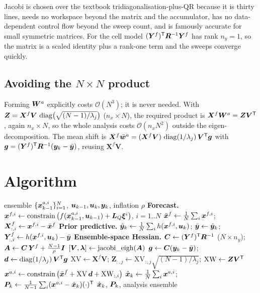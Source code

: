 Jacobi is chosen over the textbook tridiagonalisation-plus-QR because it is thirty lines, needs no
workspace beyond the matrix and the accumulator, has no data-dependent control flow beyond the
sweep count, and is famously accurate for small symmetric matrices.  For the cell model
$(\bm{Y}^f)^{\mathsf{T}}\bm{R}^{-1}\bm{Y}^f$ has rank $n_y = 1$, so the matrix is a scaled identity plus a rank-one
term and the sweeps converge quickly.

\subsection{Avoiding the $N\times N$ product}
Forming $\bm{W}^a$ explicitly costs $\mathcal{O}(N^3)$; it is never needed.  With
$\bm{Z} = \bm{X}^f\bm{V}\,\operatorname{diag}\!\big(\sqrt{(N-1)/\lambda_j}\big)$ ($n_x\times N$), the required product is
$\bm{X}^f\bm{W}^a = \bm{Z}\bm{V}^{\mathsf{T}}$, again $n_x\times N$, so the whole analysis costs
$\mathcal{O}(n_x N^2)$ outside the eigen-decomposition.  The mean shift is
$\bm{X}^f\bar{\bm w}^a = (\bm{X}^f\bm{V})\,\operatorname{diag}(1/\lambda_j)\,\bm{V}^{\mathsf{T}}\bm g$ with
$\bm g = (\bm{Y}^f)^{\mathsf{T}}\bm{R}^{-1}(\bm{y}_k-\bar{\bm{y}})$, reusing $\bm{X}^f\bm{V}$.

\section{Algorithm}
\begin{algorithm}[H]
\caption{ETKF --- one sampling period}
\begin{algorithmic}[1]
\Require ensemble $\{\bm{x}^{a,i}_{k-1}\}_{i=1}^N$, $\bm{u}_{k-1},\bm{u}_k,\bm{y}_k$, inflation $\rho$
\State \textbf{Forecast.} $\bm{x}^{f,i} \gets \operatorname{constrain}\big(f(\bm{x}^{a,i}_{k-1},\bm{u}_{k-1}) + \bm{L}_Q\bm\xi^i\big)$, $i=1..N$
\State $\bar{\bm{x}}^f \gets \frac1N\sum_i \bm{x}^{f,i}$; \quad $\bm{X}^f_{:,i} \gets \bm{x}^{f,i}-\bar{\bm{x}}^f$
\State \textbf{Prior predictive.} $\hat{\bm{y}}_k \gets \frac1N\sum_i h(\bm{x}^{f,i},\bm{u}_k)$; \; $\bar{\bm{y}}\gets\hat{\bm{y}}_k$; \; $\bm{Y}^f_{:,i}\gets h(\bm{x}^{f,i},\bm{u}_k)-\bar{\bm{y}}$
\State \textbf{Ensemble-space Hessian.} $\bm{C} \gets (\bm{Y}^f)^{\mathsf{T}}\bm{R}^{-1}$ \; ($N\times n_y$); \quad $\bm{A} \gets \bm{C}\,\bm{Y}^f + \frac{N-1}{\rho}\bm{I}$
\State $[\bm{V},\bm\lambda] \gets \operatorname{jacobi\_eigh}(\bm{A})$ 
\State $\bm g \gets \bm{C}(\bm{y}_k-\bar{\bm{y}})$; \quad $\bm d \gets \operatorname{diag}(1/\lambda_j)\,\bm{V}^{\mathsf{T}}\bm g$
\State $\mathrm{XV} \gets \bm{X}^f\bm{V}$; \quad $\bm{Z}_{:,j} \gets \mathrm{XV}_{:,j}\sqrt{(N-1)/\lambda_j}$; \quad $\mathrm{XW} \gets \bm{Z}\bm{V}^{\mathsf{T}}$
  \State $\bm{x}^{a,i} \gets \operatorname{constrain}\big(\bar{\bm{x}}^f + \mathrm{XV}\,\bm d + \mathrm{XW}_{:,i}\big)$
\EndFor
\State $\hat{\bm{x}}_k \gets \frac1N\sum_i\bm{x}^{a,i}$; \; $\bm{P}_k \gets \frac{1}{N-1}\sum_i(\bm{x}^{a,i}-\hat{\bm{x}}_k)(\cdot)^{\mathsf{T}}$
\Ensure $\hat{\bm{x}}_k$, $\bm{P}_k$, analysis ensemble
\end{algorithmic}
\end{algorithm}

